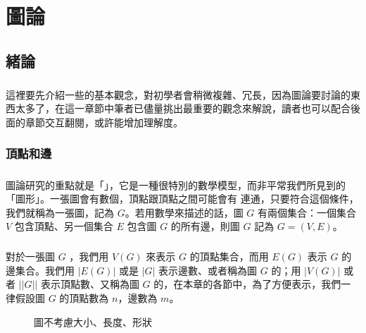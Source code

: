 \documentclass[12pt,a4paper,oneside]{report}
\begin{document}
\begin{CJK}{UTF8}{bkai}
\label{tag:def_constant}
\newcommand*{\SelectedVertexStyle}{%
   \SetVertexNormal[
     MinSize=24pt,%
     LineWidth=1.5pt,%
     FillColor=black!20]}

\chapter{圖論}
\section{緒論}
\paragraph{}這裡要先介紹一些的基本觀念，對初學者會稍微複雜、冗長，因為圖論要討論的東西太多了，在這一章節中筆者已儘量挑出最重要的觀念來解說，讀者也可以配合後面的章節交互翻閱，或許能增加理解度。

\subsection{頂點和邊}
\paragraph{}圖論研究的重點就是「\textbf{}」，它是一種很特別的數學模型，而非平常我們所見到的「圖形」。一張圖會有數個\textbf{}，頂點跟頂點之間可能會有\textbf{} 連通，只要符合這個條件，我們就稱為一張圖，記為 $G$。若用數學來描述的話，圖 $G$ 有兩個集合：一個集合 $V$ 包含頂點、另一個集合 $E$ 包含圖 $G$ 的所有邊，則圖 $G$ 記為 $G=(V,E)$。
\paragraph{}對於一張圖 $G$ ，我們用 $V(G)$ 來表示 $G$ 的頂點集合，而用 $E(G)$ 表示 $G$ 的邊集合。我們用 $|E(G)|$ 或是 $|G|$ 表示邊數、或者稱為圖 $G$ 的；用 $|V(G)|$ 或者 $||G||$ 表示頂點數、又稱為圖 $G$ 的，在本章的各節中，為了方便表示，我們一律假設圖 $G$ 的頂點數為 $n$，邊數為 $m$。
\begin{figure}[h!]
\centering
{}
\caption{圖不考慮大小、長度、形狀}
\label{fig:a_graph}
\end{figure}


\end{CJK}
\end{document}
